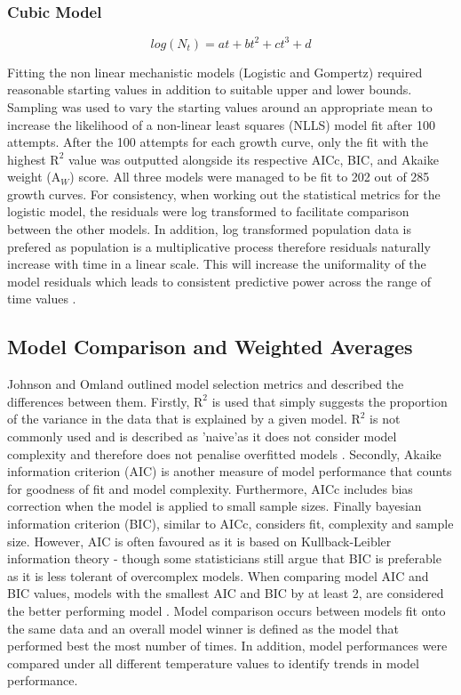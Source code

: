 \documentclass[12pt]{article}
\begin{document}
    \subsubsection{Cubic Model}
    \begin{equation}
        log(N_t) = at + bt^2 + ct^3 + d
    \end{equation}

Fitting the non linear mechanistic models (Logistic and Gompertz) required reasonable starting values in addition to suitable upper and lower bounds. Sampling was used to vary the starting values around an appropriate mean to increase the likelihood of a non-linear least squares (NLLS) model fit after 100 attempts. After the 100 attempts for each growth curve, only the fit with the highest $\mathrm{R}^2$ value was outputted alongside its respective AICc, BIC, and Akaike weight ($\mathrm{A}_{\textit{W}}$) score. All three models were managed to be fit to 202 out of 285 growth curves. For consistency, when working out the statistical metrics for the logistic model, the residuals were log transformed to facilitate comparison between the other models. In addition, log transformed population data is prefered as population is a multiplicative process therefore residuals naturally increase with time in a linear scale. This will increase the uniformality of the model residuals which leads to consistent predictive power across the range of time values \cite{Freckleton2002}.


    \subsection{Model Comparison and Weighted Averages}
Johnson and Omland outlined model selection metrics and described the differences between them. Firstly, $\mathrm{R}^2$ is used that simply suggests the proportion of the variance in the data that is explained by a given model. $\mathrm{R}^2$ is not commonly used and is described as 'naive'as it does not consider model complexity and therefore does not penalise overfitted models \cite{JOHNSON2004101}. Secondly, Akaike information criterion (AIC) is another measure of model performance that counts for goodness of fit and model complexity. Furthermore, AICc includes bias correction when the model is applied to small sample sizes. Finally bayesian information criterion (BIC), similar to AICc, considers fit, complexity and sample size. However, AIC is often favoured as it is based on Kullback-Leibler information theory \cite{JOHNSON2004101} - though some statisticians still argue that BIC is preferable as it is less tolerant of overcomplex models. When comparing model AIC and BIC values, models with the smallest AIC and BIC by at least 2, are considered the better performing model \cite{JOHNSON2004101}. Model comparison occurs between models fit onto the same data and an overall model winner is defined as the model that performed best the most number of times. In addition, model performances were compared under all different temperature values to identify trends in model performance.\\
\end{document}
